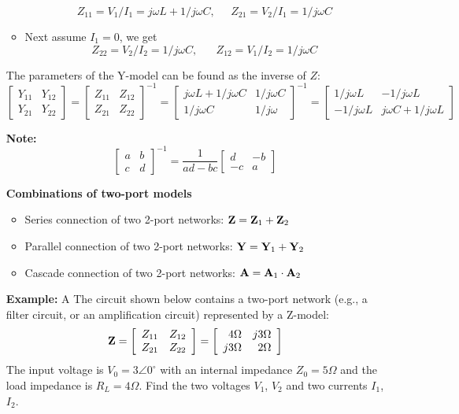 \begin{itemize}
\begin{itemize}
  \[
  Z_{11}=V_1/I_1=j\omega L+1/j\omega C,\;\;\;\;\;Z_{21}=V_2/I_1=1/j\omega C 
  \]
\item Next assume $I_1=0$, we get
  \[
  Z_{22}=V_2/I_2=1/j\omega C,\;\;\;\;\;\;Z_{12}=V_1/I_2=1/j\omega C 
  \]
\end{itemize}
The parameters of the Y-model can be found as the inverse of $Z$:
\[
\left[\begin{array}{cc}Y_{11}&Y_{12}\\Y_{21}&Y_{22}\end{array}\right]
=\left[\begin{array}{cc}Z_{11}&Z_{12}\\Z_{21}&Z_{22}\end{array}\right]^{-1}
=\left[\begin{array}{cc}j\omega L+1/j\omega C & 1/j\omega C\\
    1/j\omega C & 1/j\omega \end{array}\right]^{-1}
=\left[\begin{array}{cc}1/j\omega L & -1/j\omega L\\
    -1/j\omega L & j\omega C+1/j\omega L\end{array}\right] 
\]
	
{\bf Note:} 
\[
\left[ \begin{array}{rr} a & b \\ c & d \end{array} \right]^{-1}
=\frac{1}{ad-bc}\left[ \begin{array}{rr} d & -b \\ -c & a \end{array} \right]
\]

{\bf Combinations of two-port models}

\begin{itemize}
\item Series connection of two 2-port networks: 
	${\bf Z}={\bf Z}_1+{\bf Z}_2$
\item Parallel connection of two 2-port networks: 
	${\bf Y}={\bf Y}_1+{\bf Y}_2$
\item Cascade connection of two 2-port networks:
	${\bf A}={\bf A}_1 \cdot {\bf A}_2$
\end{itemize}


{\bf Example:} A The circuit shown below contains a two-port network (e.g., a 
filter circuit, or an amplification circuit) represented by a Z-model:
\[ {\bf Z}=\left[\begin{array}{ll} Z_{11} & Z_{12} \\ 
	Z_{21} & Z_{22} \end{array}\right]
	=\left[\begin{array}{rr} 4\Omega & j3\Omega \\ 
	j3\Omega & 2\Omega \end{array}\right]	\]
The input voltage is $V_0=3\angle 0^\circ$ with an internal impedance 
$Z_0=5\Omega$ and the load impedance is $R_L=4\Omega$. Find the two voltages 
$V_1$, $V_2$ and two currents $I_1$, $I_2$.


\end{itemize}
